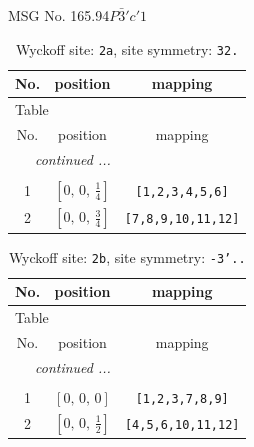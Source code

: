 \documentclass[fleqn,8pt]{jsarticle}
\begin{document}
\setcounter{MaxMatrixCols}{32}

\renewcommand{\tablename}{Table~}
\renewcommand{\figurename}{Figure~}
\begin{center}
\LARGE
MSG No. 165.94\quad$P\bar{3}'c'1$
\end{center}
\renewcommand{\arraystretch}{1.2}
\begin{longtable}{ccc}
\caption{Wyckoff site: {\tt 2a}, site symmetry: {\tt 32.}}
 \\
 \hline \hline
No. & position & mapping \\ \hline \endfirsthead

\multicolumn{2}{l}{\tablename\ \thetable{}} \\
 \hline \hline
No. & position & mapping \\ \hline \endhead

 \hline \hline
\multicolumn{2}{r}{\footnotesize\it continued ...} \\ \endfoot

 \hline \hline
\multicolumn{2}{r}{} \\ \endlastfoot

1 & $\left[ 0,\, 0,\, \frac{1}{4} \right]$ & {\tt [1,2,3,4,5,6]} \\ \hline
2 & $\left[ 0,\, 0,\, \frac{3}{4} \right]$ & {\tt [7,8,9,10,11,12]} \\
\end{longtable}
\renewcommand{\arraystretch}{1.2}
\begin{longtable}{ccc}
\caption{Wyckoff site: {\tt 2b}, site symmetry: {\tt -3'..}}
 \\
 \hline \hline
No. & position & mapping \\ \hline \endfirsthead

\multicolumn{2}{l}{\tablename\ \thetable{}} \\
 \hline \hline
No. & position & mapping \\ \hline \endhead

 \hline \hline
\multicolumn{2}{r}{\footnotesize\it continued ...} \\ \endfoot

 \hline \hline
\multicolumn{2}{r}{} \\ \endlastfoot

1 & $\left[ 0,\, 0,\, 0 \right]$ & {\tt [1,2,3,7,8,9]} \\ \hline
2 & $\left[ 0,\, 0,\, \frac{1}{2} \right]$ & {\tt [4,5,6,10,11,12]} \\
\end{longtable}
\end{document}
